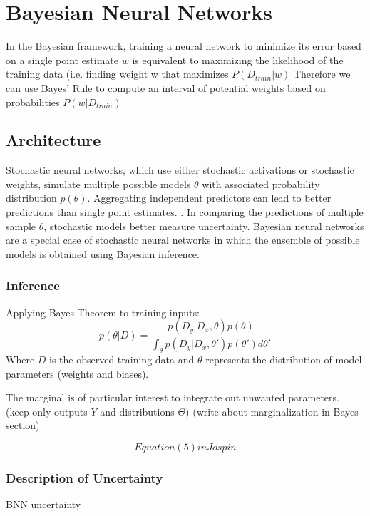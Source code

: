 \chapter{Bayesian Neural Networks}

 In the Bayesian framework, training a neural network to minimize its error based on a single point estimate $w$ is equivalent to maximizing the likelihood of the training data (i.e. finding weight w that maximizes $P(D_{train}|w)$ \cite{bishop1995} Therefore we can use Bayes’ Rule to compute an interval of potential weights based on probabilities $P(w|D_{train})$

\section{Architecture}

Stochastic neural networks, which use either stochastic activations or stochastic weights, simulate multiple possible models $\theta$ with associated probability distribution $p(\theta)$.  Aggregating independent predictors can lead to better predictions than single point estimates. \cite{Jospin}.  In comparing the predictions of multiple sample $\theta$, stochastic models better measure uncertainty.  Bayesian neural networks are a special case of stochastic neural networks in which the ensemble of possible models is obtained using Bayesian inference. \cite{mackay1992practical}

\subsection{Inference}

Applying Bayes Theorem to training inputs:
$$
p(\theta|D) = \frac{p(D_{y}|D_{x},\theta)p(\theta)}{\int_\theta p(D_{y}|D_{x},\theta')p(\theta')d\theta'}
$$
Where $D$ is the observed training data and $\theta$ represents the distribution of model parameters (weights and biases).


The marginal is of particular interest to integrate out unwanted parameters.  (keep only outputs $Y$ and distributions $\Theta$)
(write about marginalization in Bayes section)

$$
Equation (5) in Jospin
$$


\subsection{Description of Uncertainty}

BNN uncertainty \cite{Jospin}

